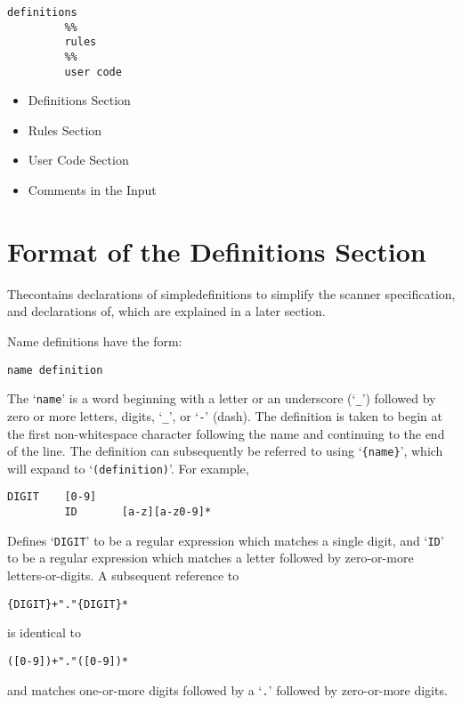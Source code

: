 \documentclass[openany,oneside]{book}
\begin{document}
\begin{verbatim}
definitions
         %%
         rules
         %%
         user code
\end{verbatim}

\begin{itemize}
\item Definitions Section
\item Rules Section
\item User Code Section
\item Comments in the Input
\end{itemize}

\section{Format of the Definitions Section}


Thecontains declarations of simpledefinitions to simplify the scanner specification, and declarations of, which are explained in a later section.

Name definitions have the form:
\begin{verbatim}
name definition
\end{verbatim}


The ‘\verb`name`’ is a word beginning with a letter or an underscore
(‘\verb`_`’) followed by zero or more letters, digits, ‘\verb`_`’, or
‘\verb`-`’ (dash).  The definition is taken to begin at the first
non-whitespace character following the name and continuing to the end of
the line.  The definition can subsequently be referred to using
‘\verb`{name}`’, which will expand to ‘\verb`(definition)`’.  For example,


\begin{verbatim}
DIGIT    [0-9]
         ID       [a-z][a-z0-9]*
\end{verbatim}


Defines ‘\verb`DIGIT`’ to be a regular expression which matches a single
digit, and ‘\verb`ID`’ to be a regular expression which matches a letter
followed by zero-or-more letters-or-digits.  A subsequent reference to


\begin{verbatim}
{DIGIT}+"."{DIGIT}*
\end{verbatim}


is identical to
\begin{verbatim}
([0-9])+"."([0-9])*
\end{verbatim}


and matches one-or-more digits followed by a ‘\verb`.`’ followed by
zero-or-more digits.
\end{document}
